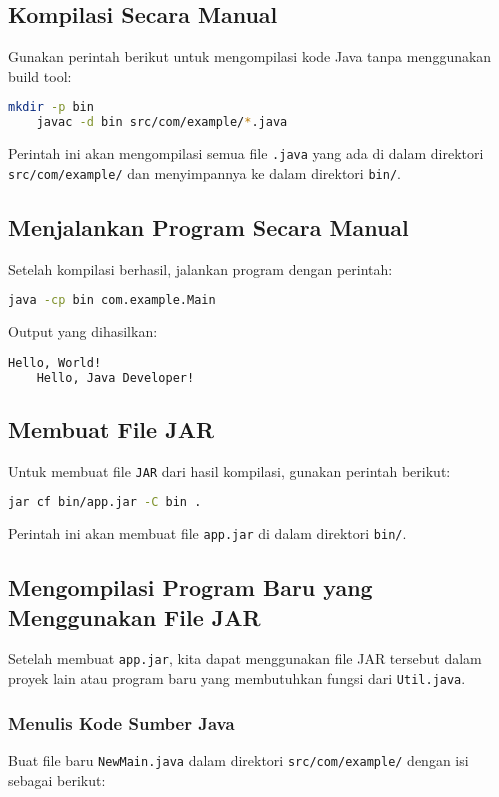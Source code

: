 \subsection{Kompilasi Secara Manual}
Gunakan perintah berikut untuk mengompilasi kode Java tanpa menggunakan build tool:

\begin{lstlisting}[language=bash]
	mkdir -p bin
	javac -d bin src/com/example/*.java
\end{lstlisting}

Perintah ini akan mengompilasi semua file \texttt{.java} yang ada di dalam direktori \texttt{src/com/example/} dan menyimpannya ke dalam direktori \texttt{bin/}.

\subsection{Menjalankan Program Secara Manual}
Setelah kompilasi berhasil, jalankan program dengan perintah:

\begin{lstlisting}[language=bash]
	java -cp bin com.example.Main
\end{lstlisting}

Output yang dihasilkan:

\begin{lstlisting}[language=bash]
	Hello, World!
	Hello, Java Developer!
\end{lstlisting}

\subsection{Membuat File JAR}
Untuk membuat file \texttt{JAR} dari hasil kompilasi, gunakan perintah berikut:

\begin{lstlisting}[language=bash]
	jar cf bin/app.jar -C bin .
\end{lstlisting}

Perintah ini akan membuat file \texttt{app.jar} di dalam direktori \texttt{bin/}. 

\subsection{Mengompilasi Program Baru yang Menggunakan File JAR}
Setelah membuat \texttt{app.jar}, kita dapat menggunakan file JAR tersebut dalam proyek lain atau program baru yang membutuhkan fungsi dari \texttt{Util.java}.

\subsubsection{Menulis Kode Sumber Java}
Buat file baru \texttt{NewMain.java} dalam direktori \texttt{src/com/example/} dengan isi sebagai berikut:

